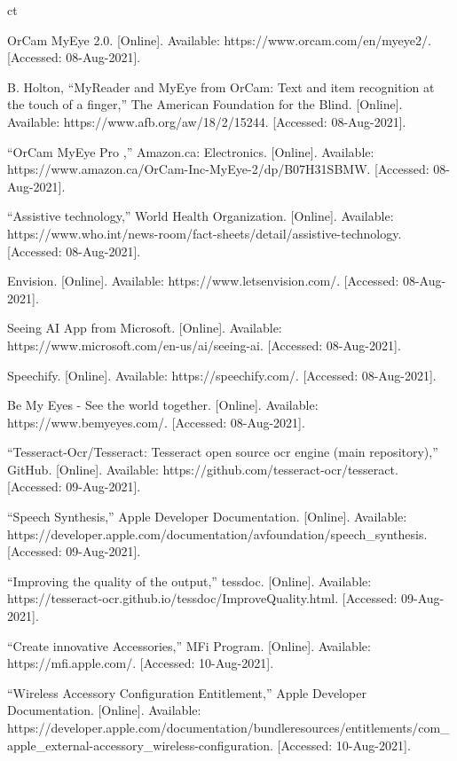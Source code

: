 ct\documentclass[a4paper,11pt]{article}
\begin{document}
\begin{thebibliography}{9}
OrCam MyEye 2.0. [Online]. Available: https://www.orcam.com/en/myeye2/. [Accessed: 08-Aug-2021].

B. Holton, “MyReader and MyEye from OrCam: Text and item recognition at the touch of a finger,” The American Foundation for the Blind. [Online]. Available: https://www.afb.org/aw/18/2/15244. [Accessed: 08-Aug-2021]. 

“OrCam MyEye Pro ,” Amazon.ca: Electronics. [Online]. Available: https://www.amazon.ca/OrCam-Inc-MyEye-2/dp/B07H31SBMW. [Accessed: 08-Aug-2021].

“Assistive technology,” World Health Organization. [Online]. Available: https://www.who.int/news-room/fact-sheets/detail/assistive-technology. [Accessed: 08-Aug-2021]. 

Envision. [Online]. Available: https://www.letsenvision.com/. [Accessed: 08-Aug-2021].

Seeing AI App from Microsoft. [Online]. Available: https://www.microsoft.com/en-us/ai/seeing-ai. [Accessed: 08-Aug-2021]. 

Speechify. [Online]. Available: https://speechify.com/. [Accessed: 08-Aug-2021]. 

Be My Eyes - See the world together. [Online]. Available: https://www.bemyeyes.com/. [Accessed: 08-Aug-2021]. 

“Tesseract-Ocr/Tesseract: Tesseract open source ocr engine (main repository),” GitHub. [Online]. Available: https://github.com/tesseract-ocr/tesseract. [Accessed: 09-Aug-2021]. 

“Speech Synthesis,” Apple Developer Documentation. [Online]. Available: https://developer.apple.com/documentation/avfoundation/speech\_synthesis. [Accessed: 09-Aug-2021]. 

“Improving the quality of the output,” tessdoc. [Online]. Available: https://tesseract-ocr.github.io/tessdoc/ImproveQuality.html. [Accessed: 09-Aug-2021]. 

“Create innovative Accessories,” MFi Program. [Online]. Available: https://mfi.apple.com/. [Accessed: 10-Aug-2021]. 

“Wireless Accessory Configuration Entitlement,” Apple Developer Documentation. [Online]. Available: https://developer.apple.com/documentation/bundleresources/entitlements/com\_apple\_external-accessory\_wireless-configuration. [Accessed: 10-Aug-2021]. 


\end{thebibliography}
\end{document}
